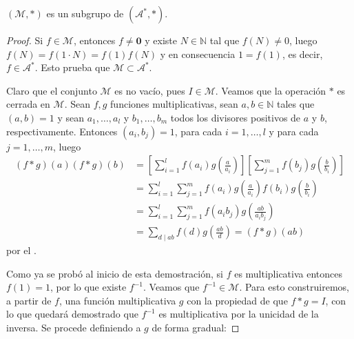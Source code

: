 \begin{theorem}\label{thm:sb1}
$(\mathcal{M},*)$ es un subgrupo de $(\mathcal{A}^*,*)$.
\end{theorem}
\begin{proof}
Si $f \in \mathcal{M}$, entonces $f \ne \mathbf{0}$ y existe $N \in \mathbb{N}$ tal que $f(N) \ne 0$, luego $f(N)=f(1 \cdot N)=f(1)f(N)$ y en consecuencia $1=f(1)$, es decir, $f \in \mathcal{A}^*$. Esto prueba que $\mathcal{M} \subset \mathcal{A}^*$.
\bigskip

Claro que el conjunto $\mathcal{M}$ es no vacío, pues $I \in \mathcal{M}$. Veamos que la operación $*$ es cerrada en $\mathcal{M}$. Sean $f,g$ funciones multiplicativas, sean $a,b \in \mathbb{N}$ tales que $(a,b)=1$ y sean $a_1,\ldots,a_l$ y $b_1,\ldots,b_m$ todos los divisores positivos de $a$ y $b$, respectivamente. Entonces $(a_i,b_j)=1$, para cada $i=1,\ldots,l$ y para cada $j=1,\ldots,m$, luego
\begin{align*}
	(f*g)(a)(f*g)(b) &= \left[ \sum_{i=1}^{l} f(a_i)g\left( \frac{a}{a_i} \right) \right]\left[ \sum_{j=1}^{m} f(b_j)g \left( \frac{b}{b_i} \right) \right] \\
					 &= \sum_{i=1}^{l} \sum_{j=1}^{m} f(a_i)g \left( \frac{a}{a_i} \right)f(b_i)g \left( \frac{b}{b_i} \right) \\
					 &= \sum_{i=1}^{l} \sum_{j=1}^{m} f(a_i b_j)g \left( \frac{a b}{a_i b_j} \right) \\
					 &= \sum_{d \mid a b}f(d)g \left( \frac{a b}{d} \right) = (f*g)(a b)
\end{align*}
por el .
\bigskip

Como ya se probó al inicio de esta demostración, si $f$ es multiplicativa entonces $f(1)=1$, por lo que existe $f^{-1}$. Veamos que $f^{-1} \in \mathcal{M}$. Para esto construiremos, a partir de $f$, una función multiplicativa $g$ con la propiedad de que $f*g=I$, con lo que quedará demostrado que $f^{-1}$ es multiplicativa por la unicidad de la inversa. Se procede definiendo a $g$ de forma gradual:


\end{proof}
